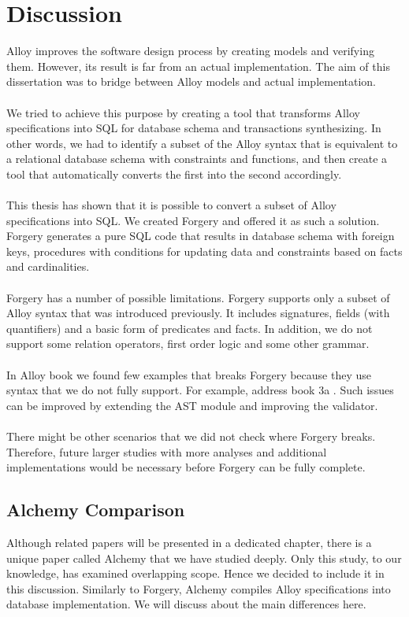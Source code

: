 \documentclass[oneside]{book}
\begin{document}
\newpage
\section{Discussion}
Alloy improves the software design process by creating models and verifying them. However, its result is far from an actual implementation. The aim of this dissertation was to bridge between Alloy models and actual implementation. 
\\\\
We tried to achieve this purpose by creating a tool that  transforms Alloy specifications into SQL for database schema and transactions synthesizing. In other words, we had to identify a subset of the Alloy syntax that is equivalent to a relational database schema with constraints and functions, and then create a tool that automatically converts the first into the second accordingly.
\\\\
This thesis has shown that it is possible to convert a subset of Alloy specifications into SQL. We created Forgery and offered it as such a solution. Forgery generates a pure SQL code that results in database schema with foreign keys, procedures with conditions for updating data and constraints based on facts and cardinalities.
\\\\
Forgery has a number of possible limitations. Forgery supports only a subset of Alloy syntax that was introduced previously. It includes signatures, fields (with quantifiers) and a basic form of predicates and facts. In addition, we do not support some relation operators, first order logic and some other grammar. 
\\\\
In Alloy book we found few examples that breaks Forgery because they use syntax that we do not fully support. For example, address book 3a \cite[p. ~25]{abstractions}. Such issues can be improved by extending the AST module and improving the validator.
\\\\
There might be other scenarios that we did not check where Forgery breaks. Therefore, future larger studies with more analyses and additional implementations would be necessary before Forgery can be fully complete.

\subsection{Alchemy Comparison}
Although related papers will be presented in a dedicated chapter, there is a unique paper called Alchemy \cite{alchemy} that we 
have studied deeply. Only this study, to our knowledge, has examined overlapping scope. Hence we decided to include it in this discussion. Similarly to Forgery, Alchemy compiles Alloy specifications into database implementation. We will discuss about the main differences here.
\end{document}

